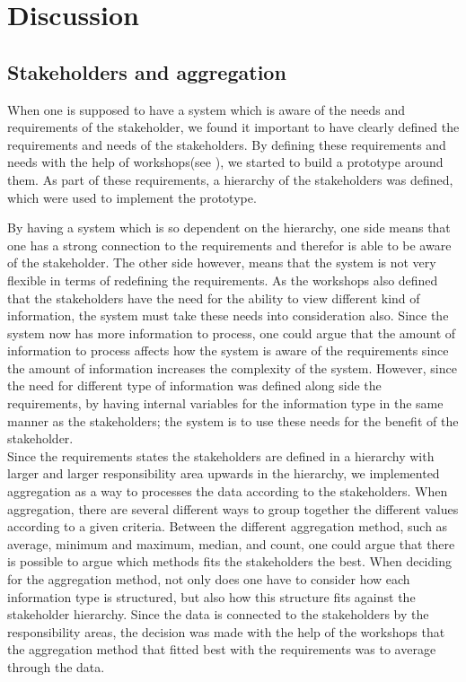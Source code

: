 \chapter{Discussion}
\label{chapter:discussion}

\section{Stakeholders and aggregation} %
\label{sec:discussion_stakeholders_and_aggregation}

When one is supposed to have a system which is aware of the needs and
requirements of the stakeholder, we found it important to have clearly 
defined the requirements and needs of the stakeholders. By defining these
requirements and needs with the help of workshops(see ), we 
started to build a prototype around them. As part of these requirements, a 
hierarchy of the stakeholders was defined, which were used to implement the 
prototype.  

By having a system which is so dependent on the hierarchy, one side means that 
one has a strong connection to the requirements and therefor is 
able to be aware of the stakeholder. The other side however, means that the 
system is not very flexible in terms of redefining the requirements. As the
workshops also defined that the stakeholders have the need for the ability to 
view different kind of information, the system must take these needs into
consideration also. Since the system now has more information to process, one
could argue that the amount of information to process affects how the system 
is aware of the requirements since the amount of information increases the 
complexity of the system. However, since the need for different type of 
information was defined along side the requirements, by having internal 
variables for the information type in the same manner as the stakeholders; the 
system is to use these needs for the benefit of the stakeholder. \\

Since the requirements states the stakeholders are defined in a hierarchy with
larger and larger responsibility area upwards in the hierarchy, we implemented
aggregation as a way to processes the data according to the stakeholders. When
aggregation, there are several different ways to group together the different
values according to a given criteria. Between the different aggregation method,
such as average, minimum and maximum, median, and count, one could argue that 
there is possible to argue which methods fits the stakeholders the best. When 
deciding for the aggregation method, not only does one have to consider how 
each information type is structured, but also how this structure fits against 
the stakeholder hierarchy. Since the data is connected to the stakeholders by 
the responsibility areas, the decision was made with the help of the workshops 
that the aggregation method that fitted best with the requirements was to 
average through the data.

